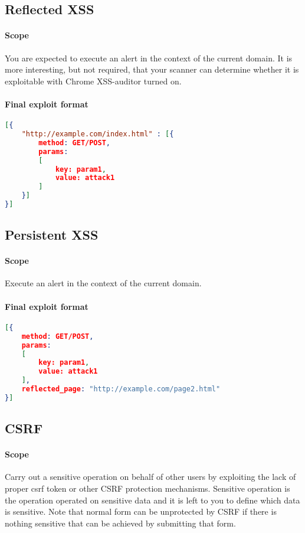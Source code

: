 \documentclass{article}[10pt]
\begin{document}
\subsection{Reflected XSS}
\paragraph{Scope} You are expected to execute an alert in the context of the current domain. It is more interesting, but not required, that your scanner can determine whether it is exploitable with Chrome XSS-auditor turned on. 

\paragraph{Final exploit format\\}
\begin{lstlisting}[language=json,firstnumber=1]
[{
	"http://example.com/index.html" : [{
		method: GET/POST,
		params: 
		[
			key: param1,
			value: attack1
		]
	}]
}]
\end{lstlisting}

\subsection{Persistent XSS}
\paragraph{Scope} Execute an alert in the context of the current domain.

\paragraph{Final exploit format\\}

\begin{lstlisting}[language=json,firstnumber=1]
[{
	method: GET/POST,
	params: 
	[
		key: param1,
		value: attack1
	],
	reflected_page: "http://example.com/page2.html"
}]
\end{lstlisting}

\subsection{CSRF} 
\paragraph{Scope} Carry out a sensitive operation on behalf of other users by exploiting the lack of proper csrf token or other CSRF protection mechanisms. Sensitive operation is the operation operated on sensitive data and it is left to you to define which data is sensitive. Note that normal form can be unprotected by CSRF if there is nothing sensitive that can be achieved by submitting that form.
\end{document}
